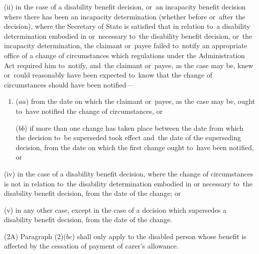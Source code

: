 \documentclass[12pt,a4paper]{article}
\begin{document}
\begin{enumerate}
\begin{enumerate}

(ii) in the case of a disability benefit decision, or~an incapacity benefit decision where there has been an incapacity determination (whether before or~after the decision), where the Secretary of State is satisfied that in relation to~a disability determination embodied in or~necessary to~the disability benefit decision, or~the incapacity determination, the claimant or~payee failed to~notify an appropriate office of a change of circumstances which regulations under the Administration Act required him to~notify, and~the claimant or~payee, as the case may be, knew or~could reasonably have been expected to~know that the change of circumstances should have been notified---
\begin{enumerate}\item[]
($aa$) from the date on which the claimant or~payee, as the case may be, ought to~have notified the change of circumstances, or

($bb$) if more than one change has taken place between the date from which the decision to~be superseded took effect and~the date of the superseding decision, from the date on which the first change ought to~have been notified, or
\end{enumerate}


(iv) in the case of a disability benefit decision, where the change of circumstances is not in relation to~the disability determination embodied in or necessary to~the disability benefit decision, from the date of the change; or

(v) in any other case, except in the case of a decision which supersedes a disability benefit decision, from the date of the change.
\end{enumerate}
\end{enumerate}

(2A) Paragraph (2)($bc$)  shall only apply to the disabled person whose benefit is affected by the cessation of payment of carer’s allowance.
\end{document}
